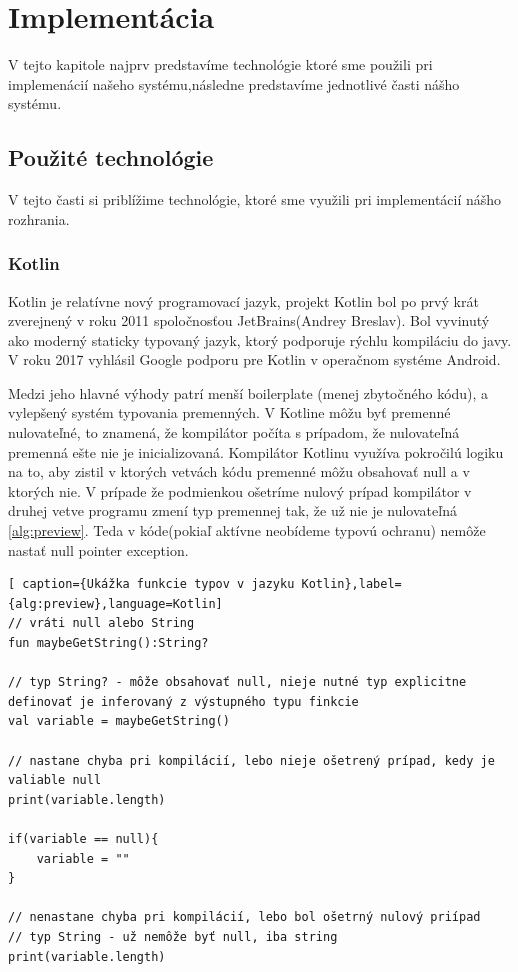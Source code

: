 \section{Implementácia}  
V tejto kapitole najprv predstavíme technológie ktoré sme použili pri implemenácií našeho systému,následne predstavíme jednotlivé časti nášho systému.



\subsection{Použité technológie} 
V tejto časti si priblížime technológie, ktoré sme využili pri implementácií nášho rozhrania.

\subsubsection{Kotlin}  
Kotlin je relatívne nový programovací jazyk, projekt Kotlin bol po prvý krát zverejnený v roku 2011 spoločnosťou JetBrains(Andrey Breslav). Bol vyvinutý ako moderný staticky typovaný jazyk, ktorý podporuje rýchlu kompiláciu do javy. V roku 2017 vyhlásil Google podporu pre Kotlin v operačnom systéme Android.   

Medzi jeho hlavné výhody patrí menší boilerplate (menej zbytočného kódu), a vylepšený systém typovania premenných. V Kotline  môžu byť premenné nulovateľné, to znamená, že kompilátor počíta s prípadom, že nulovateľná premenná ešte nie je inicializovaná. Kompilátor Kotlinu využíva pokročilú logiku na to, aby zistil v ktorých vetvách kódu premenné môžu obsahovať null a v ktorých nie. V prípade že podmienkou ošetríme nulový prípad kompilátor v druhej vetve programu zmení typ premennej tak, že už nie je nulovateľná \ref{alg:preview}. Teda v kóde(pokiaľ aktívne neobídeme typovú ochranu) nemôže nastať null pointer exception. 


\begin{lstlisting}[ caption={Ukážka funkcie typov v jazyku Kotlin},label={alg:preview},language=Kotlin] 
// vráti null alebo String 
fun maybeGetString():String? 

// typ String? - môže obsahovať null, nieje nutné typ explicitne definovať je inferovaný z výstupného typu finkcie
val variable = maybeGetString() 

// nastane chyba pri kompilácií, lebo nieje ošetrený prípad, kedy je valiable null 
print(variable.length) 

if(variable == null){ 
	variable = "" 
} 

// nenastane chyba pri kompilácií, lebo bol ošetrný nulový priípad
// typ String - už nemôže byť null, iba string
print(variable.length)  
\end{lstlisting} 



